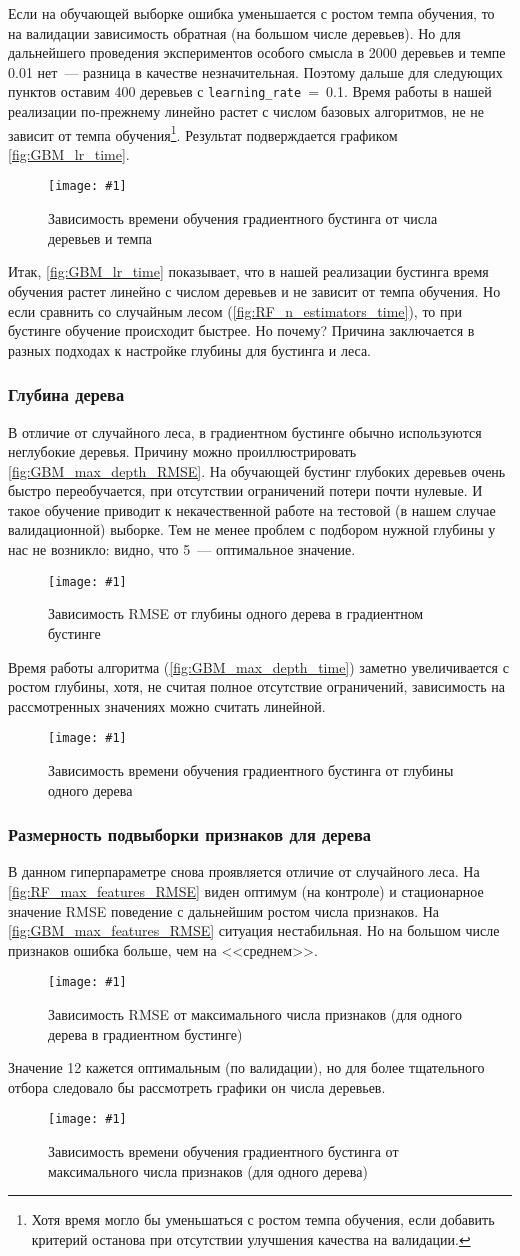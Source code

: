 \documentclass[12pt]{article}
\newcommand{\mpl}[2]{
    \begin{figure}[!h]
        \texttt{[image: \#1]}
        \centering
        \caption{#2}
        \label{fig:#1}
     \end{figure}
}
\begin{document}
Если на обучающей выборке ошибка уменьшается с ростом темпа обучения, то на валидации зависимость обратная (на большом числе деревьев). Но для дальнейшего проведения экспериментов особого смысла в 2000 деревьев и темпе 0.01 нет~--- разница в качестве незначительная. Поэтому дальше для следующих пунктов оставим 400 деревьев с \verb|learning_rate|~=~0.1. Время работы в нашей реализации по-прежнему линейно растет с числом базовых алгоритмов, не не зависит от темпа обучения\footnote{Хотя время могло бы уменьшаться с ростом темпа обучения, если добавить критерий останова при отсутствии улучшения качества на валидации.}. Результат подверждается графиком \autoref{fig:GBM_lr_time}.

\mpl{GBM_lr_time}{Зависимость времени обучения градиентного бустинга от числа деревьев и темпа}

Итак, \autoref{fig:GBM_lr_time} показывает, что в нашей реализации бустинга время обучения растет линейно с числом деревьев и не зависит от темпа обучения. Но если сравнить со случайным лесом (\autoref{fig:RF_n_estimators_time}), то при бустинге обучение происходит быстрее. Но почему? Причина заключается в разных подходах к настройке глубины для бустинга и леса.

\subsubsection{Глубина дерева}
В отличие от случайного леса, в градиентном бустинге обычно используются неглубокие деревья. Причину можно проиллюстрировать \autoref{fig:GBM_max_depth_RMSE}. На обучающей бустинг глубоких деревьев очень быстро переобучается, при отсутствии ограничений потери почти нулевые. И такое обучение приводит к некачественной работе на тестовой (в нашем случае валидационной) выборке. Тем не менее проблем с подбором нужной глубины у нас не возникло: видно, что 5~--- оптимальное значение.
\mpl{GBM_max_depth_RMSE}{Зависимость RMSE от глубины одного дерева в градиентном бустинге}
Время работы алгоритма (\autoref{fig:GBM_max_depth_time}) заметно увеличивается с ростом глубины, хотя, не считая полное отсутствие ограничений, зависимость на рассмотренных значениях можно считать линейной.
\mpl{GBM_max_depth_time}{Зависимость времени обучения градиентного бустинга от глубины одного дерева}

\subsubsection{Размерность подвыборки признаков для дерева}
В данном гиперпараметре снова проявляется отличие от случайного леса. На \autoref{fig:RF_max_features_RMSE} виден оптимум (на контроле) и стационарное значение RMSE поведение с дальнейшим ростом числа признаков. На \autoref{fig:GBM_max_features_RMSE} ситуация нестабильная. Но на большом числе признаков ошибка больше, чем на <<среднем>>. 
\mpl{GBM_max_features_RMSE}{Зависимость RMSE от максимального числа признаков (для одного дерева в градиентном бустинге)}
Значение 12 кажется оптимальным (по валидации), но для более тщательного отбора следовало бы рассмотреть графики он числа деревьев.
\mpl{GBM_max_features_time}{Зависимость времени обучения градиентного бустинга от максимального числа признаков (для одного дерева)}
\end{document}
